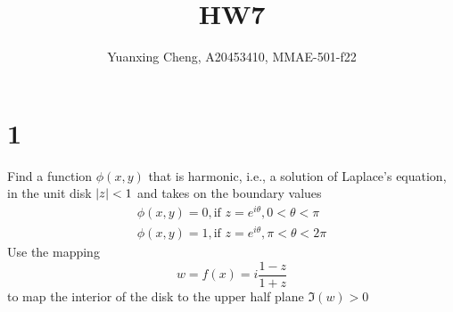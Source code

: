 \documentclass{article}
\title{HW7}
\author{Yuanxing Cheng, A20453410, MMAE-501-f22}
\begin{document}
\maketitle

\section*{1}

\begin{myleftlinebox}
    Find a function \(\phi(x,y)\) that is harmonic, i.e., a solution of Laplace's equation, in the unit disk \(\left\vert z\right\vert<1\) and takes on the boundary values
    \begin{equation}
        \begin{split}
            \phi(x,y)=0, \text{if } z=e^{i\theta}, 0<\theta<\pi\\
            \phi(x,y)=1, \text{if } z=e^{i\theta}, \pi<\theta<2\pi
        \end{split}
    \end{equation}
    Use the mapping 
    \[w=f(x)=i\frac{1-z}{1+z}\]
    to map the interior of the disk to the upper half plane \(\Im(w)>0\)
    \tcbline
\end{myleftlinebox}
\end{document}
